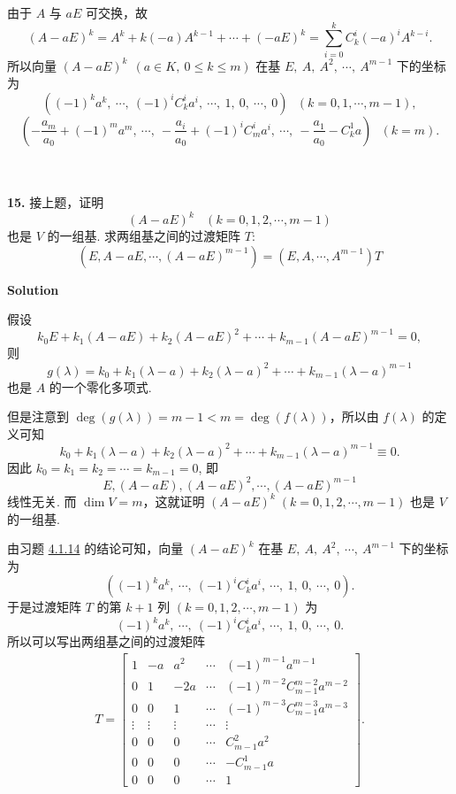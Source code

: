 \documentclass[11pt,a4paper,openany,oneside]{book}
\newcommand\Solution{\noindent\textbf{\textsf{Solution}}\par\medskip}
\begin{document}
由于 $ A $ 与 $ aE $ 可交换，故
 $$  (A - aE)^k = A^k + k(-a)A^{k-1} + \cdots + (-aE)^k = \sum\limits_{i=0}^k C_k^i(-a)^{i}A^{k-i}.$$ 
所以向量  $ (A - aE)^k\ \ (a \in K, \ 0 \leq k \leq m) $  在基 $  E,\ A,\ A^2,\ \cdots,\ A^{m-1}   $ 下的坐标为
 $$ \left((-1)^ka^k,\ \cdots,\ (-1)^{i}C_k^ia^{i},\ \cdots,\ 1,\ 0,\ \cdots,\ 0 \right) \ \ \ (k = 0, 1, \cdots, m-1), $$ 
 $$ \left(-\dfrac{a_m}{a_0}+(-1)^ma^m,\ \cdots,\ -\dfrac{a_i}{a_0}+(-1)^{i}C_m^ia^{i},\ \cdots,\ -\dfrac{a_1}{a_0} - C_k^1a  \right) \ \ \ (k = m). $$   \\ \\ 


\begin{myexample}
	\textbf{15.} 
接上题，证明
 $$  (A - aE)^k \ \ \ \ (k =0, 1, 2, \cdots, m-1 ) $$ 
也是 $ V $ 的一组基. 求两组基之间的过渡矩阵 $ T $: 
 $$  (E, A-aE, \cdots, (A-aE)^{m-1}) = (E, A, \cdots, A^{m-1})T  $$   
\end{myexample}
\Solution

假设
 $$  k_0E + k_1(A-aE) + k_2 (A-aE)^2 + \cdots + k_{m-1}(A-aE)^{m-1} = 0, $$ 
则 
 $$ g(\lambda) =k_0 + k_1(\lambda-a) + k_2(\lambda-a)^2 + \cdots + k_{m-1}(\lambda-a)^{m-1} $$ 
也是 $ A $ 的一个零化多项式.  

但是注意到 $ \deg(g(\lambda)) = m-1 < m = \deg(f(\lambda))$，所以由 $ f(\lambda) $ 的定义可知
 $$  k_0 + k_1(\lambda-a) + k_2(\lambda-a)^2 + \cdots + k_{m-1}(\lambda-a)^{m-1} \equiv 0.$$ 
因此 $ k_0 = k_1 = k_2 = \cdots = k_{m-1} = 0 $, 即
\[
E, (A-aE), (A-aE)^2, \cdots, (A-aE)^{m-1}
\]
线性无关. 而 $ \dim V = m $，这就证明 $(A - aE)^k\;(k =0, 1, 2, \cdots, m-1 )$  也是 $ V $ 的一组基.

由习题 \hyperlink{4.1.14}{4.1.14} 的结论可知，向量 $ (A - aE)^k $ 在基 $  E,\ A,\ A^2,\ \cdots,\ A^{m-1}  $ 下的坐标为
$$ 
\left((-1)^ka^k,\ \cdots,\ (-1)^{i}C_k^ia^{i},\ \cdots,\ 1,\ 0,\ \cdots,\ 0 \right).  
$$ 
于是过渡矩阵 $ T $ 的第 $ k+1 $ 列 $ (k=0,1,2,\cdots, m-1) $ 为
$$  
(-1)^ka^k,\ \cdots,\ (-1)^{i}C_k^ia^{i},\ \cdots,\ 1,\ 0,\ \cdots,\ 0 . $$ 
所以可以写出两组基之间的过渡矩阵
\begin{gather*}
T = 
\begin{bmatrix}
1  &  -a  &  a^2 & \cdots & (-1)^{m-1}a^{m-1} \\
0  &   1  &  -2a & \cdots & (-1)^{m-2}C_{m-1}^{m-2}a^{m-2} \\
0  &   0  &  1   & \cdots & (-1)^{m-3}C_{m-1}^{m-3} a^{m-3} \\
\vdots & \vdots & \vdots & \cdots & \vdots  \\
0  &   0  &  0   &  \cdots &  C_{m-1}^2a^2 \\
0  &  0  &  0    &  \cdots  &  -C_{m-1}^{1}a  \\
0  &  0  &  0    &  \cdots  &  1  
\end{bmatrix}.
\end{gather*}  \\  \\  \\
\end{document}
